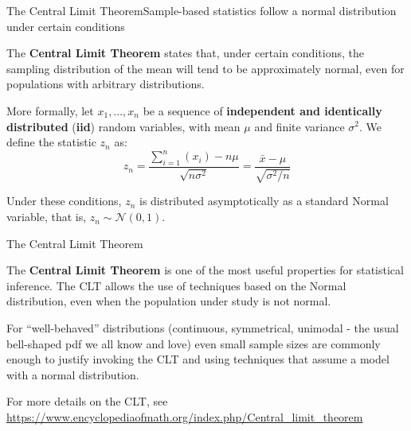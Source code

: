 \begin{frame}{The Central Limit Theorem}{Sample-based statistics follow a normal distribution under certain conditions}

The {\bf Central Limit Theorem} states that, under certain conditions, the sampling distribution of the mean will tend to be approximately normal, even for populations with arbitrary distributions.
\bigskip

More formally, let $x_1,\ldots,x_n$ be a sequence of \textbf{independent and identically distributed} (\textbf{iid}) random variables, with mean $\mu$ and finite variance $\sigma^2$. We define the statistic $z_n$ as:
\begin{equation*}
z_n = \frac{\sum\limits_{i=1}^{n}{(x_i)} - n\mu}{\sqrt{n\sigma^2}} = \frac{\bar{x} - \mu}{\sqrt{\sigma^2/n}}
\end{equation*}

Under these conditions, $z_n$ is distributed asymptotically as a standard Normal variable, that is, $z_n\sim\mathcal{N}(0,1)$.
\end{frame}

\begin{frame}{The Central Limit Theorem}

The {\bf Central Limit Theorem} is one of the most useful properties for statistical inference. The CLT allows the use of techniques based on the Normal distribution, even when the population under study is not normal.\bigskip

For ``well-behaved'' distributions (continuous, symmetrical, unimodal - the usual bell-shaped pdf we all know and love) even small sample sizes are commonly enough to justify invoking the CLT and using techniques that assume a model with a normal distribution.\bigskip

For more details on the CLT, see \url{https://www.encyclopediaofmath.org/index.php/Central_limit_theorem}
\end{frame}


%
%

